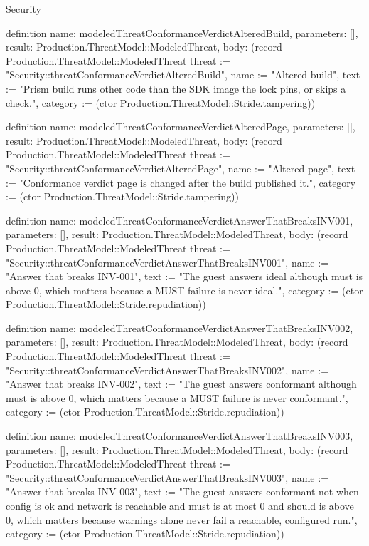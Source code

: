 \begin{lexlean}{Security}
\begin{semanticmodule}
definition{
  name: modeledThreatConformanceVerdictAlteredBuild,
  parameters: [],
  result: Production.ThreatModel::ModeledThreat,
  body: (record Production.ThreatModel::ModeledThreat {threat := "Security::threatConformanceVerdictAlteredBuild", name := "Altered build", text := "Prism build runs other code than the SDK image the lock pins, or skips a check.", category := (ctor Production.ThreatModel::Stride.tampering)})
}

definition{
  name: modeledThreatConformanceVerdictAlteredPage,
  parameters: [],
  result: Production.ThreatModel::ModeledThreat,
  body: (record Production.ThreatModel::ModeledThreat {threat := "Security::threatConformanceVerdictAlteredPage", name := "Altered page", text := "Conformance verdict page is changed after the build published it.", category := (ctor Production.ThreatModel::Stride.tampering)})
}

definition{
  name: modeledThreatConformanceVerdictAnswerThatBreaksINV001,
  parameters: [],
  result: Production.ThreatModel::ModeledThreat,
  body: (record Production.ThreatModel::ModeledThreat {threat := "Security::threatConformanceVerdictAnswerThatBreaksINV001", name := "Answer that breaks INV-001", text := "The guest answers ideal although must is above 0, which matters because a MUST failure is never ideal.", category := (ctor Production.ThreatModel::Stride.repudiation)})
}

definition{
  name: modeledThreatConformanceVerdictAnswerThatBreaksINV002,
  parameters: [],
  result: Production.ThreatModel::ModeledThreat,
  body: (record Production.ThreatModel::ModeledThreat {threat := "Security::threatConformanceVerdictAnswerThatBreaksINV002", name := "Answer that breaks INV-002", text := "The guest answers conformant although must is above 0, which matters because a MUST failure is never conformant.", category := (ctor Production.ThreatModel::Stride.repudiation)})
}

definition{
  name: modeledThreatConformanceVerdictAnswerThatBreaksINV003,
  parameters: [],
  result: Production.ThreatModel::ModeledThreat,
  body: (record Production.ThreatModel::ModeledThreat {threat := "Security::threatConformanceVerdictAnswerThatBreaksINV003", name := "Answer that breaks INV-003", text := "The guest answers conformant not when config is ok and network is reachable and must is at most 0 and should is above 0, which matters because warnings alone never fail a reachable, configured run.", category := (ctor Production.ThreatModel::Stride.repudiation)})
}


\end{semanticmodule}
\end{lexlean}
